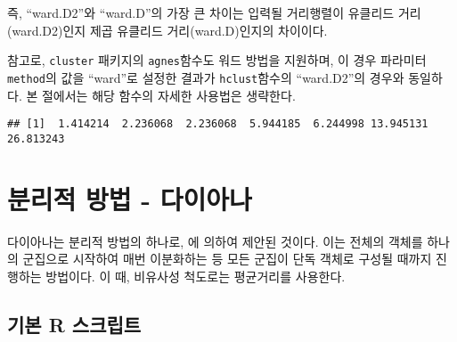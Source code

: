\documentclass[]{book}
\newenvironment{Shaded}{\begin{snugshade}}{\end{snugshade}}
\newcommand{\DataTypeTok}[1]{\textcolor[rgb]{0.13,0.29,0.53}{#1}}
\newcommand{\DecValTok}[1]{\textcolor[rgb]{0.00,0.00,0.81}{#1}}
\newcommand{\KeywordTok}[1]{\textcolor[rgb]{0.13,0.29,0.53}{\textbf{#1}}}
\newcommand{\NormalTok}[1]{#1}
\newcommand{\OperatorTok}[1]{\textcolor[rgb]{0.81,0.36,0.00}{\textbf{#1}}}
\newcommand{\StringTok}[1]{\textcolor[rgb]{0.31,0.60,0.02}{#1}}
\begin{document}
즉, ``ward.D2''와 ``ward.D''의 가장 큰 차이는 입력될 거리행렬이 유클리드 거리(ward.D2)인지 제곱 유클리드 거리(ward.D)인지의 차이이다.

참고로, \texttt{cluster} 패키지의 \texttt{agnes}함수도 워드 방법을 지원하며, 이 경우 파라미터 \texttt{method}의 값을 ``ward''로 설정한 결과가 \texttt{hclust}함수의 ``ward.D2''의 경우와 동일하다. 본 절에서는 해당 함수의 자세한 사용법은 생략한다.

\begin{Shaded}
\end{Shaded}

\begin{verbatim}
## [1]  1.414214  2.236068  2.236068  5.944185  6.244998 13.945131 26.813243
\end{verbatim}

\hypertarget{diana}{%
\section{분리적 방법 - 다이아나}\label{diana}}

다이아나는 분리적 방법의 하나로, \citet{kaufman1990finding} 에 의하여 제안된 것이다. 이는 전체의 객체를 하나의 군집으로 시작하여 매번 이분화하는 등 모든 군집이 단독 객체로 구성될 때까지 진행하는 방법이다. 이 때, 비유사성 척도로는 평균거리를 사용한다.

\hypertarget{diana-basic-script}{%
\subsection{기본 R 스크립트}\label{diana-basic-script}}
\end{document}

